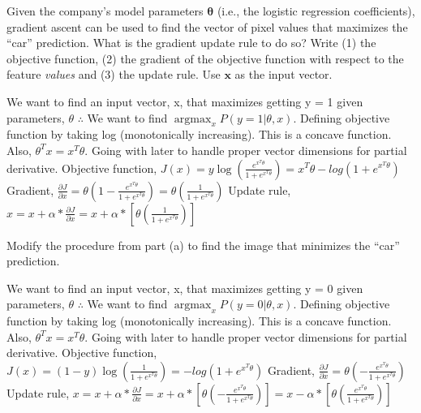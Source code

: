 \documentclass[11pt,addpoints,answers]{exam}
\newcommand{\xv}{\mathbf{x}}
\newcommand{\thetav     }{\boldsymbol \theta     }
\newcommand \argmax {\operatorname*{argmax}}
\begin{document}
\begin{questions}
 
\question[2]  Given the company's model parameters $\thetav$ (i.e., the logistic regression coefficients), gradient ascent can be used to find the vector of pixel values that maximizes the ``car” prediction. What is the gradient update rule to do so? Write (1) the objective function, (2) the gradient of the objective function with respect to the feature \emph{values} and (3) the update rule. 
Use $\xv$ as the input vector. 

\begin{your_solution}[height=5cm]
 
 We want to find an input vector, x, that maximizes getting y = 1 given parameters, $\theta$\newline
 $\therefore$ We want to find $\argmax_x P(y = 1 | \theta, x)$.\newline
 Defining objective function by taking log (monotonically increasing). This is a concave function. Also, $\theta^Tx = x^T\theta$. Going with later to handle proper vector dimensions for partial derivative. \newline
 Objective function, $J(x) = y\log(\frac{e^{x^T\theta}}{1 + e^{x^T\theta}}) = x^T\theta - log(1 + e^{x^T\theta})$\newline
 Gradient, $\frac{\partial J}{\partial x} = \theta (1 - \frac{e^{x^T\theta}}{1 + e^{x^T\theta}}) = \theta (\frac{1}{1 + e^{x^T\theta}})$\newline
 Update rule, $x = x + \alpha * \frac{\partial J}{\partial x} = x + \alpha * [\theta (\frac{1}{1 + e^{x^T\theta}})]$
 
\end{your_solution}


\question[1] Modify the procedure from part (a) to find the image that minimizes the “car” prediction.

\begin{your_solution}[title=Your Answer, height=7cm,width=15.3cm]
 We want to find an input vector, x, that maximizes getting y = 0 given parameters, $\theta$\newline
 $\therefore$ We want to find $\argmax_x P(y = 0 | \theta, x)$.\newline
 Defining objective function by taking log (monotonically increasing). This is a concave function. Also, $\theta^Tx = x^T\theta$. Going with later to handle proper vector dimensions for partial derivative. \newline
 Objective function, $J(x) = (1 - y)\log(\frac{1}{1 + e^{x^T\theta}}) = - log(1 + e^{x^T\theta})$\newline
 Gradient, $\frac{\partial J}{\partial x} = \theta (- \frac{e^{x^T\theta}}{1 + e^{x^T\theta}})$\newline
 Update rule, $x = x + \alpha * \frac{\partial J}{\partial x} = x + \alpha * [\theta (- \frac{e^{x^T\theta}}{1 + e^{x^T\theta}})] = x - \alpha * [\theta (\frac{e^{x^T\theta}}{1 + e^{x^T\theta}})]$
\end{your_solution}


\end{questions}
\end{document}
